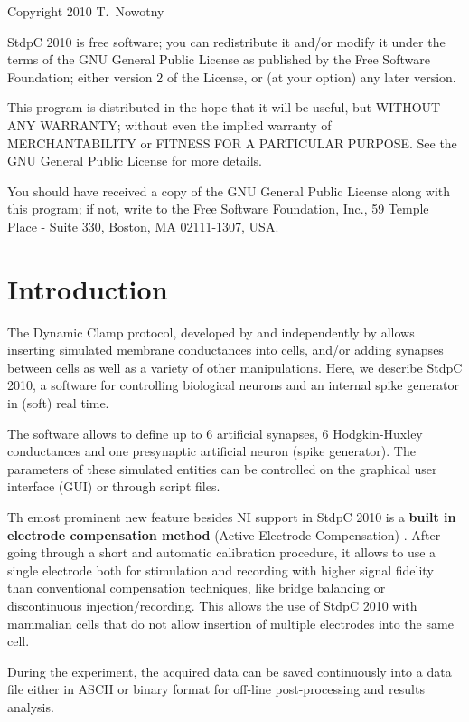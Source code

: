\documentclass{article}
\begin{document}
Copyright 2010 T.~Nowotny

StdpC 2010 is free software; you can redistribute it and/or modify  
it under the terms of the GNU General Public License as published by 
the Free Software Foundation; either version 2 of the License, or 
(at your option) any later version.                               

This program is distributed in the hope that it will be useful,
but WITHOUT ANY WARRANTY; without even the implied warranty of
MERCHANTABILITY or FITNESS FOR A PARTICULAR PURPOSE.  See the 
GNU General Public License for more details.

You should have received a copy of the GNU General Public License
along with this program; if not, write to the
Free Software Foundation, Inc., 59 Temple Place - Suite 330, Boston,
MA  02111-1307, USA.

\newpage
\section{Introduction}
           
The Dynamic Clamp protocol, developed by \cite{Sharp1993} and
independently by \cite{Robinson1993} allows inserting simulated
membrane conductances into cells, and/or adding synapses between cells
as well as a variety of other manipulations. Here, we describe StdpC
2010, a software for controlling biological neurons and an internal
spike generator in (soft) real time.

The software allows to define up to $6$ artificial synapses, $6$
Hodgkin-Huxley conductances \cite{Hodgkin1949} and one presynaptic
artificial neuron (spike generator). The parameters of these simulated
entities can be controlled on the graphical user interface (GUI) or
through script files.  

Th emost prominent new feature besides NI support in StdpC 2010 is a
{\bf built in electrode compensation method} (Active
Electrode Compensation) \cite{Brette2008}. After
going through a short and automatic calibration procedure, it allows
to use a single electrode both
for stimulation and recording with higher signal fidelity than conventional
compensation techniques, like bridge balancing or discontinuous
injection/recording. This allows the use of StdpC 2010 with mammalian
cells that do not allow insertion of multiple electrodes into the same cell.

During the experiment, the acquired data can be saved continuously into a
data file either in ASCII or binary format for off-line post-processing and
results analysis.
 
\end{document}
